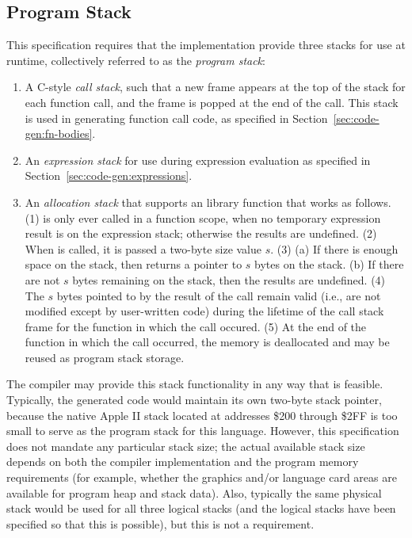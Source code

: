 \documentclass[10pt]{article}
\begin{document}
\subsection{Program Stack}
\label{sec:code-gen:program-stack}

This specification requires that the implementation provide three
stacks for use at runtime, collectively referred to as the
\emph{program stack}:
%
\begin{enumerate}
%
\item A C-style \emph{call stack}, such that a new frame appears at
  the top of the stack for each function call, and the frame is popped
  at the end of the call.  This stack is used in generating function
  call code, as specified in Section~\ref{sec:code-gen:fn-bodies}.
%
\item An \emph{expression stack} for use during expression evaluation
  as specified in Section~\ref{sec:code-gen:expressions}.
%
\item An \emph{allocation stack} that supports an 
  library function that works as follows.  (1)  is only
  ever called in a function scope, when no temporary expression result
  is on the expression stack; otherwise the results are undefined.
  (2) When  is called, it is passed a two-byte size
  value $s$.  (3) (a) If there is enough space on the stack, then
   returns a pointer to $s$ bytes on the stack. (b) If
  there are not $s$ bytes remaining on the stack, then the results are
  undefined. (4) The $s$ bytes pointed to by the result of the
   call remain valid (i.e., are not modified except by
  user-written code) during the lifetime of the call stack frame for
  the function in which the  call occured.  (5) At the
  end of the function in which the  call occurred, the
  memory is deallocated and may be reused as program stack storage.
%
\end{enumerate}

The compiler may provide this stack functionality in any way that is
feasible.  Typically, the generated code would maintain its own
two-byte stack pointer, because the native Apple II stack located at
addresses \$200 through \$2FF is too small to serve as the program
stack for this language.  However, this specification does not mandate
any particular stack size; the actual available stack size depends on
both the compiler implementation and the program memory requirements
(for example, whether the graphics and/or language card areas are
available for program heap and stack data).  Also, typically the same
physical stack would be used for all three logical stacks (and the
logical stacks have been specified so that this is possible), but this
is not a requirement.
\end{document}

